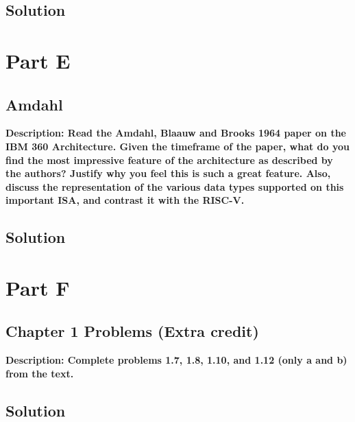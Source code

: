 \breakrule

\subsection{Solution}


\newpage



\section{Part E}

\subsection{Amdahl}
\textbf{Description: Read	the	Amdahl,	Blaauw	and	Brooks	1964	paper	on	the	IBM	360	Architecture.
Given	the	timeframe	of	the	paper,	what	do	you	find	the	most	impressive	feature	of	
the	architecture	as	described	by	the	authors?		Justify	why	you	feel	this	is	such	a	
great	feature.		Also,	discuss the	representation	of	the	various	data types	supported	
on	this	important	ISA,	and	contrast	it	with	the	RISC-V.}

\breakrule

\subsection{Solution}


\newpage



\section{Part F}

\subsection{Chapter 1 Problems (Extra credit)}
\textbf{Description: Complete	problems	1.7,	1.8,	1.10,	and	1.12	(only	a	and	b) from	the	text.}

\breakrule

\subsection{Solution}


\newpage

